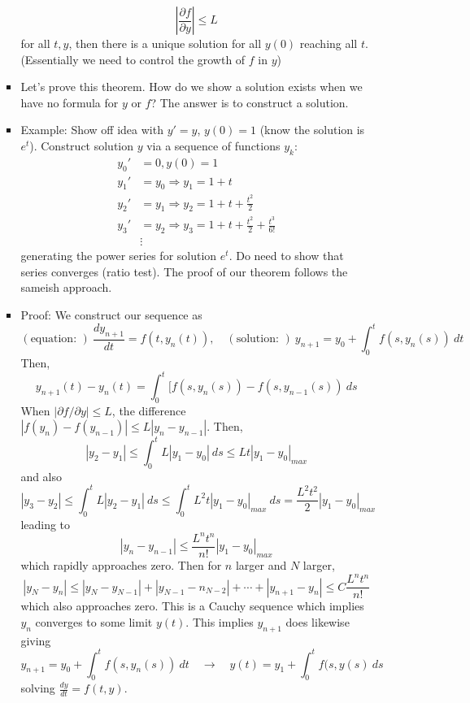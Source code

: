 \documentclass{article}
\begin{document}
\begin{enumerate}
\begin{enumerate}
\begin{itemize}
\[
\left|\frac{\partial f}{\partial y} \right| \leq L 
\]
for all $t,y$, then there is a unique solution for all $y(0)$ reaching all $t$. (Essentially we need to control the growth of $f$ in $y$)
\item Let's prove this theorem. How do we show a solution exists when we have no formula for $y$ or $f$? The answer is to construct a solution.
\item Example: Show off idea with $y'=y$, $y(0)=1$ (know the solution is $e^t$). Construct solution $y$ via a sequence of functions $y_k$:
\begin{align*}
y_0' &= 0, y(0)=1 \\
y_1' &= y_0 \Rightarrow y_1 = 1+t \\
y_2' &= y_1 \Rightarrow y_2 = 1+t+\frac{t^2}{2} \\
y_3' &= y_2 \Rightarrow y_3 = 1+t+\frac{t^2}{2}+\frac{t^3}{6!} \\
&\vdots
\end{align*}
generating the power series for solution $e^t$. 
Do need to show that series converges (ratio test).
The proof of our theorem follows the sameish approach.
\item Proof: We construct our sequence as
\[
(\text{equation: })~ \frac{dy_{n+1}}{dt} = f(t,y_n(t)), \quad 
(\text{solution: })~ y_{n+1}=y_0+\int_0^t f(s,y_n(s))~dt
\]
Then,
\[
y_{n+1}(t)-y_n(t)= \int_0^t [f(s,y_n(s))-f(s,y_{n-1}(s))~ds
\]
When $|\partial f/\partial y| \leq L$, the difference $|f(y_n)-f(y_{n-1})| \leq L|y_n-y_{n-1}|$. Then,
\[
|y_2-y_1| \leq \int_0^t L|y_1-y_0|~ds \leq Lt |y_1-y_0|_{max}
\] 
and also
\[
|y_3-y_2| \leq \int_0^t L|y_2-y_1|~ds \leq \int_0^t L^2t|y_1-y_0|_{max}~ds = \frac{L^2t^2}{2}  |y_1-y_0|_{max}
\] 
leading to 
\[
|y_n-y_{n-1}| \leq \frac{L^nt^n}{n!}  |y_1-y_0|_{max}
\]
which rapidly approaches zero. Then for $n$ larger and $N$ larger,
\[
|y_N-y_n| \leq |y_N-y_{N-1}| + |y_{N-1}-n_{N-2}| + \cdots + |y_{n+1}-y_n| \leq C \frac{L^nt^n}{n!}
\]
which also approaches zero. This is a Cauchy sequence which implies $y_n$ converges to some limit $y(t)$. This implies $y_{n+1}$ does likewise giving
\[
 y_{n+1}=y_0+\int_0^t f(s,y_n(s))~dt \quad \rightarrow \quad y(t)=y_1 + \int_0^t f(s,y(s)~ds
\]
solving $\frac{dy}{dt}=f(t,y)$.
\end{itemize}

\end{enumerate}



\end{enumerate}
\end{document}
